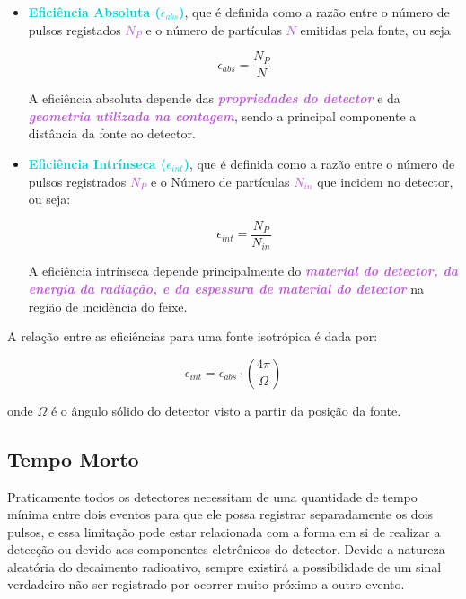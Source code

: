 \documentclass[11pt,a4paper]{article}
\begin{document}
			\begin{itemize}
				\item \textcolor{DarkTurquoise}{\textbf{Eficiência Absoluta ($\epsilon_{abs}$)}}, que é definida como a razão entre o número de pulsos registados \textcolor{MediumOrchid}{\textit{\textbf{$N_P$}}} e o número de partículas \textcolor{MediumOrchid}{\textit{\textbf{$N$}}} emitidas pela fonte, ou seja
				
					\begin{equation}
						\epsilon_{abs} = \frac{N_P}{N}
					\end{equation}
				
				A eficiência absoluta depende das \textcolor{MediumOrchid}{\textit{\textbf{propriedades do detector}}} e da \textcolor{MediumOrchid}{\textit{\textbf{geometria  utilizada na contagem}}}, sendo a principal componente a distância da fonte ao detector.
				
				\item \textcolor{DarkTurquoise}{\textbf{Eficiência Intrínseca ($\epsilon_{int}$)}}, que é definida como a razão entre o número de pulsos registrados \textcolor{MediumOrchid}{\textit{\textbf{$N_P$}}} e o Número de partículas \textcolor{MediumOrchid}{\textit{\textbf{$N_{in}$}}} que incidem no detector, ou seja:
				
					\begin{equation}
						\epsilon_{int} = \frac{N_P}{N_{in}}
					\end{equation}

				A eficiência intrínseca depende principalmente do \textcolor{MediumOrchid}{\textit{\textbf{material do detector, da energia da radiação, e da espessura de material do detector}}} na região de incidência do feixe. 
			\end{itemize}

		A relação entre as eficiências para uma fonte isotrópica é dada por:

			\begin{equation}
					\epsilon_{int} = \epsilon_{abs} \cdot \left(\frac{4 \pi}{\Omega}\right)
			\end{equation}

		\noindent onde $\Omega$ é o ângulo sólido do detector visto a partir da posição da fonte.

	\subsection*{Tempo Morto}

		Praticamente todos os detectores necessitam de uma quantidade de tempo mínima entre dois eventos para que ele possa registrar separadamente os dois pulsos, e essa limitação pode estar relacionada com a forma em si de realizar a detecção ou devido aos componentes eletrônicos do detector. Devido a natureza aleatória do decaimento radioativo, sempre existirá a possibilidade de um sinal verdadeiro não ser registrado por ocorrer muito próximo a outro evento. 
\end{document}
